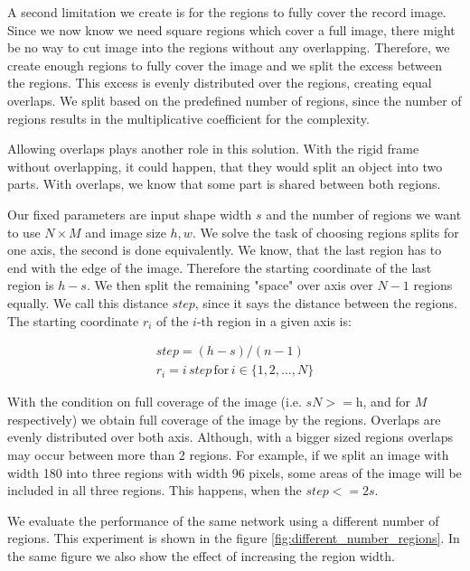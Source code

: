 A second limitation we create is for the regions to fully cover the record image. Since we now know we need square regions which cover a full image, there might be no way to cut image into the regions without any overlapping. Therefore, we create enough regions to fully cover the image and we split the excess between the regions. This excess is evenly distributed over the regions, creating equal overlaps. We split based on the predefined number of regions, since the number of regions results in the multiplicative coefficient for the complexity.

Allowing overlaps plays another role in this solution. With the rigid frame without overlapping, it could happen, that they would split an object into two parts. With overlaps, we know that some part is shared between both regions.

Our fixed parameters are input shape width $s$ and the number of regions we want to use $N \times M$ and image size $h, w$. We solve the task of choosing regions splits for one axis, the second is done equivalently. We know, that the last region has to end with the edge of the image. Therefore the starting coordinate of the last region is $h - s$. We then split the remaining "space" over axis over $N-1$ regions equally. We call this distance $step$, since it says the distance between the regions. The starting coordinate $r_i$ of the $i$-th region in a given axis is:

\begin{align*}
step = (h - s) / (n - 1) \\
r_i = {i \, step\,\text{for}\,i \in \{1, 2, \dots, N\}}
\end{align*}

With the condition on full coverage of the image (i.e. \(s N >= \text{h}\), and for $M$ respectively) we obtain full coverage of the image by the regions. Overlaps are evenly distributed over both axis. Although, with a bigger sized regions overlaps may occur between more than 2 regions. For example, if we split an image with width 180 into three regions with width 96 pixels, some areas of the image will be included in all three regions. This happens, when the $step <= 2 s$.

We evaluate the performance of the same network using a different number of regions. This experiment is shown in the figure \ref{fig:different_number_regions}. In the same figure we also show the effect of increasing the region width.

